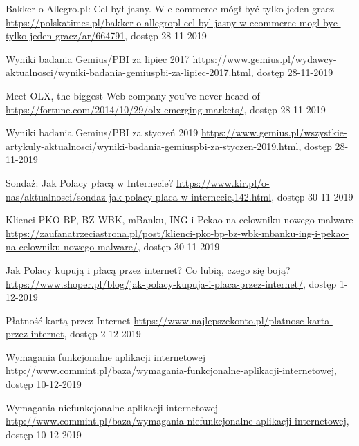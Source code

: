 \documentclass[12pt]{article}
\numberwithin{figure}{section}
\begin{document}
\begin{sloppypar}
\begin{thebibliography}{99}
    Bakker o Allegro.pl: Cel był jasny. W e-commerce mógł być tylko jeden gracz
    \url{https://polskatimes.pl/bakker-o-allegropl-cel-byl-jasny-w-ecommerce-mogl-byc-tylko-jeden-gracz/ar/664791}, dostęp 28-11-2019
    
    Wyniki badania Gemius/PBI za lipiec 2017
    \url{https://www.gemius.pl/wydawcy-aktualnosci/wyniki-badania-gemiuspbi-za-lipiec-2017.html}, dostęp 28-11-2019
    
    Meet OLX, the biggest Web company you’ve never heard of
    \url{https://fortune.com/2014/10/29/olx-emerging-markets/}, dostęp 28-11-2019
    
    Wyniki badania Gemius/PBI za styczeń 2019
    \url{https://www.gemius.pl/wszystkie-artykuly-aktualnosci/wyniki-badania-gemiuspbi-za-styczen-2019.html}, dostęp 28-11-2019
    
    Sondaż: Jak Polacy płacą w Internecie?
    \url{https://www.kir.pl/o-nas/aktualnosci/sondaz-jak-polacy-placa-w-internecie,142.html}, dostęp 30-11-2019
    
    Klienci PKO BP, BZ WBK, mBanku, ING i Pekao na celowniku nowego malware
    \url{https://zaufanatrzeciastrona.pl/post/klienci-pko-bp-bz-wbk-mbanku-ing-i-pekao-na-celowniku-nowego-malware/}, dostęp 30-11-2019
    
    Jak Polacy kupują i płacą przez internet? Co lubią, czego się boją?
    \url{https://www.shoper.pl/blog/jak-polacy-kupuja-i-placa-przez-internet/}, dostęp 1-12-2019
    
    Płatność kartą przez Internet
    \url{https://www.najlepszekonto.pl/platnosc-karta-przez-internet}, dostęp 2-12-2019
    
    Wymagania funkcjonalne aplikacji internetowej
    \url{http://www.commint.pl/baza/wymagania-funkcjonalne-aplikacji-internetowej}, dostęp 10-12-2019
    
    Wymagania niefunkcjonalne aplikacji internetowej
    \url{http://www.commint.pl/baza/wymagania-niefunkcjonalne-aplikacji-internetowej}, dostęp 10-12-2019
    

\end{thebibliography}
\end{sloppypar}
\end{document}
